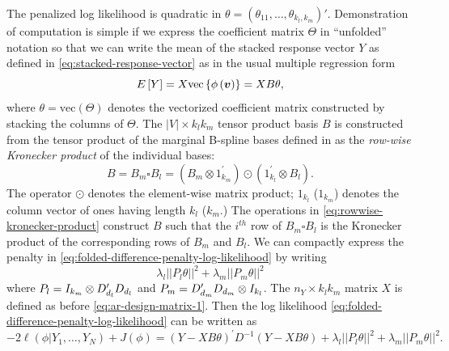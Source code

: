 The penalized log likelihood is quadratic in $\theta = \left(\theta_{11}, \dots, \theta_{k_l, k_m} \right)'$. Demonstration of computation is simple if we express the coefficient matrix $\Theta$ in ``unfolded'' notation so that we can write the mean of the stacked response vector $Y$ as defined in \eqref{eq:stacked-response-vector} as in the usual multiple regression form
\begin{equation*}
E\left[Y \right] = X\mbox{vec}\left\{\phi\left( \mbox{\boldmath $v$} \right)\right\} = X B \theta,
\end{equation*}
\noindent
where $\theta = \mbox{vec}\left( \Theta \right)$ denotes the vectorized coefficient matrix constructed by stacking the columns of $\Theta$. The $\vert V \vert \times k_l k_m$ tensor product basis $B$ is constructed from the tensor product of the marginal B-spline bases defined in \citet{eilers2006fast} as the \textit{row-wise Kronecker product} of the individual bases:
\begin{equation} \label{eq:rowwise-kronecker-product}
B = B_m \square B_l = \left( B_m \otimes 1^\prime_{k_m} \right) \odot \left(1^\prime_{k_l} \otimes  B_l  \right).
\end{equation}
\noindent
The operator $\odot$ denotes the element-wise matrix product; $1_{k_l}$ ($1_{k_m}$) denotes the column vector of ones having length $k_l$ ($k_m$.) The operations in \eqref{eq:rowwise-kronecker-product} construct $B$ such that the $i^{th}$ row of $B_m\square B_l$ is the Kronecker product of the corresponding rows of $B_m$ and $B_l$. We can compactly express the penalty in \eqref{eq:folded-difference-penalty-log-likelihood} by writing
\begin{equation*} \label{eq:tensor-product-penalty}
\lambda_l \vert \vert P_l \theta \vert \vert^2 + \lambda_m \vert \vert P_m \theta \vert\vert^2
\end{equation*}
\noindent
where $P_l = I_{k_m} \otimes D'_{d_{\scriptscriptstyle l}} D_{d_{\scriptscriptstyle l}} $ and $P_m =  D'_{d_{\scriptscriptstyle m}} D_{d_{\scriptscriptstyle m}} \otimes I_{k_l}$. The $n_Y \times k_lk_m$  matrix $X$ is defined as before \eqref{eq:ar-design-matrix-1}. Then the log likelihood \eqref{eq:folded-difference-penalty-log-likelihood} can be written as
\begin{equation} \label{eq:tensor-pspline-objective-function}
-2\ell\left(\phi \vert Y_1,\dots, Y_N\right) + J\left(\phi\right) = \left( Y - XB\theta\right)^\prime D^{-1}\left( Y - XB\theta\right)  + \lambda_l\vert\vert P_l \theta \vert\vert^2 + \lambda_m \vert\vert P_m \theta\vert \vert^2.
\end{equation}
